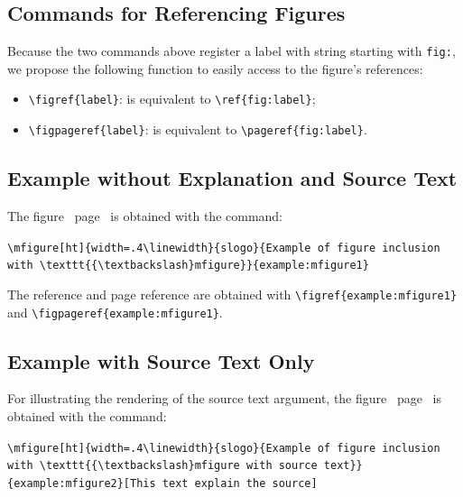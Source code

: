 \documentclass[book,taskpackage,specpackage,codepackage]{upmethodology-document}
\begin{document}
\subsection{Commands for Referencing Figures}

Because the two commands above register a label with string starting with \texttt{fig:}, we propose the following function to easily access to the figure's references:
\begin{itemize}
\item \texttt{{\textbackslash}figref\{label\}}: is equivalent to \texttt{{\textbackslash}ref\{fig:label\}};
\item \texttt{{\textbackslash}figpageref\{label\}}: is equivalent to \texttt{{\textbackslash}pageref\{fig:label\}}.
\end{itemize}

\subsection{Example without Explanation and Source Text}

The figure~ page~ is obtained with the command:

\texttt{{\textbackslash}mfigure[ht]\{width=.4{\textbackslash}linewidth\}\{slogo\}\{Example of figure inclusion with {\textbackslash}texttt\{\{{\textbackslash}textbackslash\}mfigure\}\}\{example:mfigure1\}}

The reference and page reference are obtained with \texttt{{\textbackslash}figref\{example:mfigure1\}} and \texttt{{\textbackslash}figpageref\{example:mfigure1\}}.


\subsection{Example with Source Text Only}

For illustrating the rendering of the source text argument, the figure~ page~ is obtained with the command:

\texttt{{\textbackslash}mfigure[ht]\{width=.4{\textbackslash}linewidth\}\{slogo\}\{Example of figure inclusion with {\textbackslash}texttt\{\{{\textbackslash}textbackslash\}mfigure with source text\}\}\{example:mfigure2\}[This text explain the source]}
\end{document}
